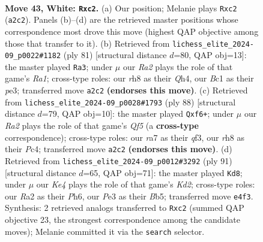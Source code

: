 \documentclass[11pt]{article}
\begin{document}
\clearpage

\begin{figure}[p]\centering
\begin{subfigure}{0.46\textwidth}\centering
\resizebox{\linewidth}{!}{%
\newchessgame
\chessboard[
  setfen={7r/r3k3/1pp3p1/4p1p1/Pp1PK3/4P3/R1q5/2B5 w - - 0 43},
  showmover=false,
  pgfstyle=straightmove, color=movearrow, markmove={a2-c2}
]}
\caption{}
\end{subfigure}\hfill
\begin{subfigure}{0.46\textwidth}\centering
\resizebox{\linewidth}{!}{%
\newchessgame
\chessboard[
  setfen={r5k1/5p2/2Q3p1/3p2Pp/1P1P3q/4P3/p4P2/R4K2 b - - 0 41},
  showmover=false,
  pgfstyle=straightmove, color=movearrow, markmove={a8-a3}
]}
\caption{}
\end{subfigure}
\\[4pt]
\begin{subfigure}{0.46\textwidth}\centering
\resizebox{\linewidth}{!}{%
\newchessgame
\chessboard[
  setfen={8/pp2R3/5b1p/2pP1Q2/2P2P1k/P4qp1/5P2/6K1 w - - 8 45},
  showmover=false,
  pgfstyle=straightmove, color=movearrow, markmove={f5-f6}
]}
\caption{}
\end{subfigure}\hfill
\begin{subfigure}{0.46\textwidth}\centering
\resizebox{\linewidth}{!}{%
\newchessgame
\chessboard[
  setfen={8/3k1Q2/4p2p/1b1pPp1P/pP1P4/R4r2/5P1K/3q4 b - - 1 46},
  showmover=false,
  pgfstyle=straightmove, color=movearrow, markmove={d7-d8}
]}
\caption{}
\end{subfigure}
\caption{\textbf{Move 43, White: \texttt{Rxc2}.} (a) Our position; Melanie plays \texttt{Rxc2} (\texttt{a2c2}). Panels (b)--(d) are the retrieved master positions whose correspondence most drove this move (highest QAP objective among those that transfer to it). (b) Retrieved from \texttt{lichess\_elite\_2024-09\_p0022\#1182} (ply 81) [structural distance $d$=80, QAP obj=13]: the master played \texttt{Ra3}; under $\mu$ our \emph{Ra2} plays the role of that game's \emph{Ra1}; cross-type roles: our \emph{r}h8 as their \emph{Q}h4, our \emph{B}c1 as their \emph{p}e3; transferred move \texttt{a2c2} \textbf{(endorses this move)}. (c) Retrieved from \texttt{lichess\_elite\_2024-09\_p0028\#1793} (ply 88) [structural distance $d$=79, QAP obj=10]: the master played \texttt{Qxf6+}; under $\mu$ our \emph{Ra2} plays the role of that game's \emph{Qf5} (a \textbf{cross-type} correspondence); cross-type roles: our \emph{r}a7 as their \emph{q}f3, our \emph{r}h8 as their \emph{P}c4; transferred move \texttt{a2c2} \textbf{(endorses this move)}. (d) Retrieved from \texttt{lichess\_elite\_2024-09\_p0012\#3292} (ply 91) [structural distance $d$=65, QAP obj=71]: the master played \texttt{Kd8}; under $\mu$ our \emph{Ke4} plays the role of that game's \emph{Kd2}; cross-type roles: our \emph{R}a2 as their \emph{P}h6, our \emph{P}e3 as their \emph{B}b5; transferred move \texttt{e4f3}. Synthesis: 2 retrieved analogs transferred to \texttt{Rxc2} (summed QAP objective 23, the strongest correspondence among the candidate moves); Melanie committed it via the \texttt{search} selector.}
\label{fig:thought-m84}
\end{figure}
\end{document}
